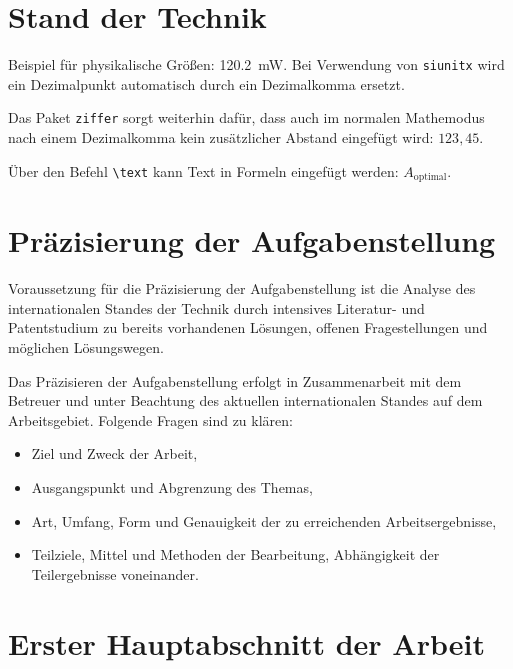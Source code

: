 \documentclass[%
  paper=a4,
  fontsize=12pt,
  twoside=false,
  headsepline=true,
  numbers=noenddot]{scrartcl}
\begin{document}
\section{Stand der Technik}
%

Beispiel für physikalische Größen: \qty{120.2}{\milli\watt}. Bei Verwendung von \texttt{siunitx} wird ein Dezimalpunkt automatisch durch ein Dezimalkomma ersetzt.

Das Paket \texttt{ziffer} sorgt weiterhin dafür, dass auch im normalen Mathemodus nach einem Dezimalkomma kein zusätzlicher Abstand eingefügt wird: $123,45$.

Über den Befehl \texttt{\textbackslash{}text} kann Text in Formeln eingefügt werden: $A_\text{optimal}$.




\section{Präzisierung der Aufgabenstellung}

Voraussetzung für die Präzisierung der Aufgabenstellung ist die Analyse des internationalen
Standes der Technik durch intensives Literatur- und Patentstudium zu
bereits vorhandenen Lösungen, offenen Fragestellungen und möglichen Lösungswegen.

Das Präzisieren der Aufgabenstellung erfolgt in Zusammenarbeit mit dem Betreuer und
unter Beachtung des aktuellen internationalen Standes auf dem Arbeitsgebiet. Folgende
Fragen sind zu klären:

\begin{itemize}
\item Ziel und Zweck der Arbeit,
\item Ausgangspunkt und Abgrenzung des Themas,
\item Art, Umfang, Form und Genauigkeit der zu erreichenden Arbeitsergebnisse,
\item Teilziele, Mittel und Methoden der Bearbeitung, Abhängigkeit der Teilergebnisse
voneinander.
\end{itemize}



\section{Erster Hauptabschnitt der Arbeit}
\end{document}
